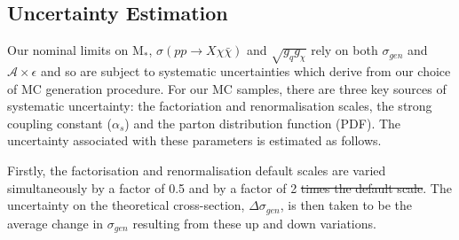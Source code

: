 \subsection{Uncertainty Estimation}
\begin{flushleft}
Our nominal limits on M$_{*}$, $\sigma(pp \rightarrow X\chi\bar{\chi})$ and $\sqrt{g_{q}g_{\chi}}$ rely on both $\sigma_{gen}$ and $\mathcal{A}\times\epsilon$ and so are subject to systematic uncertainties which derive from our choice of MC generation procedure. For our MC samples, there are three key sources of systematic uncertainty: the factoriation and renormalisation scales, the strong coupling constant ($\alpha_{s}$) and the parton distribution function (PDF). The uncertainty associated with these parameters is estimated as follows.
\bigskip

%
%
Firstly, the factorisation and renormalisation default scales are varied simultaneously by a factor of 0.5  and by a factor of 2  \st{times the default scale}. The uncertainty on the theoretical cross-section, $\Delta \sigma_{gen}$, is then taken to be the average change in $\sigma_{gen}$ resulting from these up and down variations.
\bigskip


\end{flushleft}

